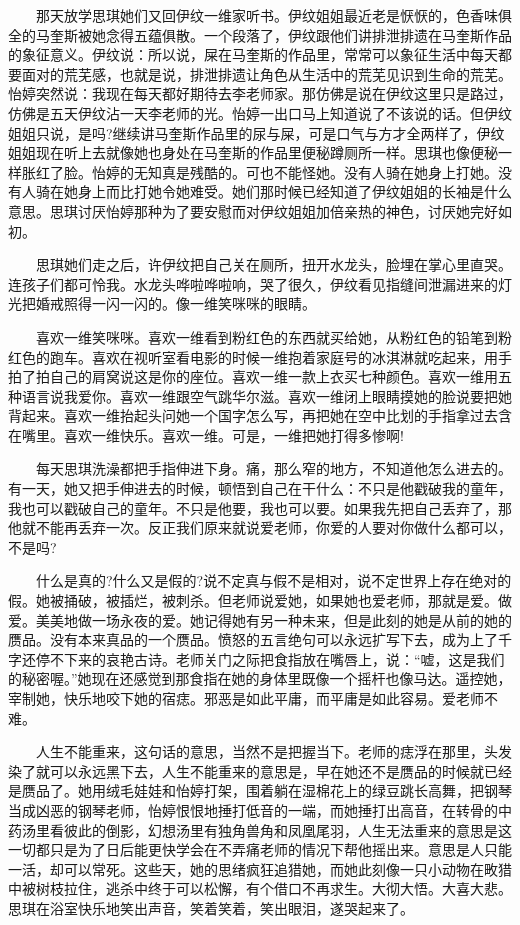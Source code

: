 \documentclass[12pt,UTF8]{ctexbook}
\begin{document}
　　那天放学思琪她们又回伊纹一维家听书。伊纹姐姐最近老是恹恹的，色香味俱全的马奎斯被她念得五蕴俱散。一个段落了，伊纹跟他们讲排泄排遗在马奎斯作品的象征意义。伊纹说：所以说，屎在马奎斯的作品里，常常可以象征生活中每天都要面对的荒芜感，也就是说，排泄排遗让角色从生活中的荒芜见识到生命的荒芜。怡婷突然说：我现在每天都好期待去李老师家。那仿佛是说在伊纹这里只是路过，仿佛是五天伊纹沾一天李老师的光。怡婷一出口马上知道说了不该说的话。但伊纹姐姐只说，是吗?继续讲马奎斯作品里的尿与屎，可是口气与方才全两样了，伊纹姐姐现在听上去就像她也身处在马奎斯的作品里便秘蹲厕所一样。思琪也像便秘一样胀红了脸。怡婷的无知真是残酷的。可也不能怪她。没有人骑在她身上打她。没有人骑在她身上而比打她令她难受。她们那时候已经知道了伊纹姐姐的长袖是什么意思。思琪讨厌怡婷那种为了要安慰而对伊纹姐姐加倍亲热的神色，讨厌她完好如初。

　　思琪她们走之后，许伊纹把自己关在厕所，扭开水龙头，脸埋在掌心里直哭。连孩子们都可怜我。水龙头哗啦哗啦响，哭了很久，伊纹看见指缝间泄漏进来的灯光把婚戒照得一闪一闪的。像一维笑咪咪的眼睛。

　　喜欢一维笑咪咪。喜欢一维看到粉红色的东西就买给她，从粉红色的铅笔到粉红色的跑车。喜欢在视听室看电影的时候一维抱着家庭号的冰淇淋就吃起来，用手拍了拍自己的肩窝说这是你的座位。喜欢一维一款上衣买七种颜色。喜欢一维用五种语言说我爱你。喜欢一维跟空气跳华尔滋。喜欢一维闭上眼睛摸她的脸说要把她背起来。喜欢一维抬起头问她一个国字怎么写，再把她在空中比划的手指拿过去含在嘴里。喜欢一维快乐。喜欢一维。可是，一维把她打得多惨啊!

　　每天思琪洗澡都把手指伸进下身。痛，那么窄的地方，不知道他怎么进去的。有一天，她又把手伸进去的时候，顿悟到自己在干什么：不只是他戳破我的童年，我也可以戳破自己的童年。不只是他要，我也可以要。如果我先把自己丢弃了，那他就不能再丢弃一次。反正我们原来就说爱老师，你爱的人要对你做什么都可以，不是吗?

　　什么是真的?什么又是假的?说不定真与假不是相对，说不定世界上存在绝对的假。她被捅破，被插烂，被刺杀。但老师说爱她，如果她也爱老师，那就是爱。做爱。美美地做一场永夜的爱。她记得她有另一种未来，但是此刻的她是从前的她的赝品。没有本来真品的一个赝品。愤怒的五言绝句可以永远扩写下去，成为上了千字还停不下来的哀艳古诗。老师关门之际把食指放在嘴唇上，说：\enquote{嘘，这是我们的秘密喔。}她现在还感觉到那食指在她的身体里既像一个摇杆也像马达。遥控她，宰制她，快乐地咬下她的宿痣。邪恶是如此平庸，而平庸是如此容易。爱老师不难。

　　人生不能重来，这句话的意思，当然不是把握当下。老师的痣浮在那里，头发染了就可以永远黑下去，人生不能重来的意思是，早在她还不是赝品的时候就已经是赝品了。她用绒毛娃娃和怡婷打架，围着躺在湿棉花上的绿豆跳长高舞，把钢琴当成凶恶的钢琴老师，怡婷恨恨地捶打低音的一端，而她捶打出高音，在转骨的中药汤里看彼此的倒影，幻想汤里有独角兽角和凤凰尾羽，人生无法重来的意思是这一切都只是为了日后能更快学会在不弄痛老师的情况下帮他摇出来。意思是人只能一活，却可以常死。这些天，她的思绪疯狂追猎她，而她此刻像一只小动物在畋猎中被树枝拉住，逃杀中终于可以松懈，有个借口不再求生。大彻大悟。大喜大悲。思琪在浴室快乐地笑出声音，笑着笑着，笑出眼泪，遂哭起来了。
\end{document}
